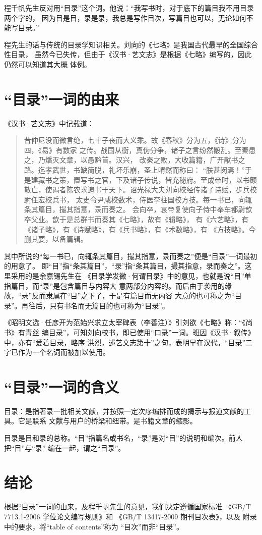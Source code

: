 程千帆先生反对用“目录”这个词。他说：“我写书时，对于底下的篇目我不用目录两个字的，
因为目是目，录是录，我总是写作目次，写篇目也可以，无论如何不能写目录。”\cite{cheng2008}

程先生的话与传统的目录学知识相关。刘向的《七略》是我国古代最早的全国综合性目录，
虽然今已失传，但由于《汉书·艺文志》是根据《七略》编写的，因此仍然可以知道其大概
体例。

\section{“目录”一词的由来}

《汉书·艺文志》中记载道：

\begin{quotation}
昔仲尼没而微言绝，七十子丧而大义乖。故《春秋》分为五，《诗》分为四，《易》有数家
之传。战国从衡，真伪分争，诸子之言纷然殽乱。至秦患之，乃燔灭文章，以愚黔首。汉兴，
改秦之败，大收篇籍，广开献书之路。迄孝武世，书缺简脱，礼坏乐崩，圣上喟然而称曰：
“朕甚闵焉！”于是建藏书之策，置写书之官，下及诸子传说，皆充秘府。至成帝时，以书颇
散亡，使谒者陈农求遗书于天下。诏光禄大夫刘向校经传诸子诗赋，步兵校尉任宏校兵书，
太史令尹咸校数术，侍医李柱国校方技。每一书已，向辄条其篇目，撮其指意，录而奏之。
会向卒，哀帝复使向子侍中奉车都尉歆卒父业。歆于是总群书而奏其《七略》，故有《辑略》，
有《六艺略》，有《诸子略》，有《诗赋略》，有《兵书略》，有《术数略》，有
《方技略》。今删其要，以备篇辑。
\end{quotation}

其中所说的“每一书已，向辄条其篇目，撮其指意，录而奏之”便是“目录”一词最初的用意了。
即“目”指“条其篇目”，“录”指“条其篇目，撮其指意，录而奏之”。这里采用的是余嘉锡先生在
《目录学发微·何谓目录》中的意见，也就是说“目”单指篇目，而“录”是包含篇目与内容大
意两部分内容的。而后由于袭用的缘故，“录”反而隶属在“目”之下了，于是有篇目而无内容
大意的也可称之为“目录”。再往后，只有书名而无篇目的也可称为“目录”。

《昭明文选·任彦开为范始兴求立太宰碑表（李善注）》引刘欲《七略》称：“《尚书》有青丝
编目录”，可知刘向校书，即已使用“口录”一词。班因《汉书·叙传》中，亦有“爱着目录，略序
洪烈，述艺文志第十”之句，表明早在汉代，“目录”二字已作为一个名词而被加以使用。

\section{“目录”一词的含义}

目录：是指著录一批相关文献，并按照一定次序编排而成的揭示与报道文献的工具。它是联系
文献与用户的桥梁和纽带。是书籍文章的缩影。

目录是目和录的总称。“目”指篇名或书名，“录”是对“目”的说明和编次。前人把“目”与“录”
编在一起，谓之“目录”。

\section{结论}

根据“目录”一词的由来，及程千帆先生的意见，我们决定遵循国家标准
《GB/T 7713.1-2006 学位论文编写规则》\cite{gbt7713.1-2006}和
《GB/T 13417-2009 期刊目次表》\cite{gbt13417-2009}，以及
附录\cite{chap:njureq}中的要求，将``table of contents''称为
“目次”而非“目录”。

